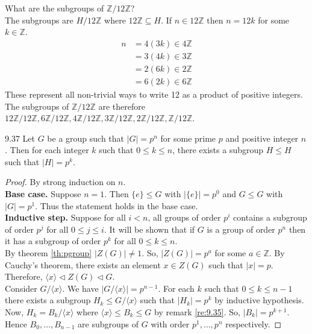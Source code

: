 \documentclass[12pt]{article}
\newcommand{\Z}{\mathbb{Z}}
\begin{document}
	\begin{myex}{}{}
		What are the subgroups of $\Z/12\Z$?\\
		
		The subgroups are $H/12\Z$ where $12\Z\subseteq H$. If $n\in12\Z$ then $n=12k$ for some $k\in\Z$.
		\begin{align*}
			n&=4(3k)\in4\Z\\
			&=3(4k)\in3\Z\\
			&=2(6k)\in2\Z\\
			&=6(2k)\in6\Z
		\end{align*}
		These represent all non-trivial ways to write 12 as a product of positive integers. The subgroups of $\Z/12\Z$ are therefore $12\Z/12\Z, 6\Z/12\Z, 4\Z/12\Z, 3\Z/12\Z, 2\Z/12\Z, \Z/12\Z$.
	\end{myex}
	
	\begin{mythm}{}{9.37}
		Let $G$ be a group such that $|G|=p^n$ for some prime $p$ and positive integer $n$. Then for each integer $k$ such that $0\leq k\leq n$, there exists a subgroup $H\leq H$ such that $|H|=p^k$.
		\begin{proof}
			By strong induction on $n$.\\
			
			\textbf{Base case.} Suppose $n=1$. Then $\{e\}\leq G$ with $|\{e\}|=p^0$ and $G\leq G$ with $|G|=p^1$. Thus the statement holds in the base case.\\
			
			\textbf{Inductive step.} Suppose for all $i<n$, all groups of order $p^i$ contains a subgroup of order $p^j$ for all $0\leq j\leq i$. It will be shown that if $G$ is a group of order $p^n$ then it has a subgroup of order $p^k$ for all $0\leq k\leq n$.\\
			
			By theorem \ref{th:pgroup} $|Z(G)|\neq1$. So, $|Z(G)|=p^a$ for some $a\in\Z$. By Cauchy's theorem, there exists an element $x\in Z(G)$ such that $|x|=p$. Therefore, $\langle x\rangle\lhd Z(G)\lhd G$.\\
			
			Consider $G/\langle x\rangle$. We have $|G/\langle x\rangle|=p^{n-1}$. For each $k$ such that $0\leq k\leq n-1$ there exists a subgroup $H_k\leq G/\langle x\rangle$ such that $|H_k|=p^k$ by inductive hypothesis.\\
			
			Now, $H_k=B_k/\langle x\rangle$ where $\langle x\rangle\leq B_k\leq G$ by remark \ref{re:9.35}. So, $|B_k|=p^{k+1}$. Hence $B_0, \dots, B_{n-1}$ are subgroups of $G$ with order $p^1, \dots, p^n$ respectively.
		\end{proof}
	\end{mythm}
	
\end{document}
